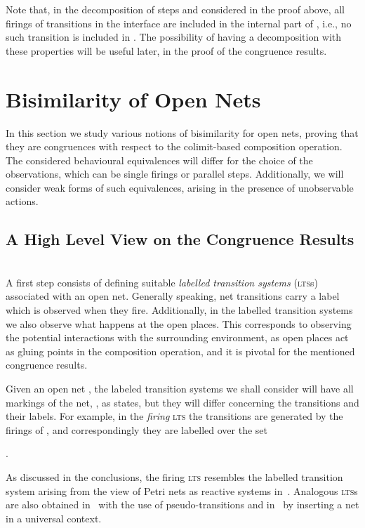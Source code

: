 \documentclass{LMCS}
\begin{document}
Note that, in the decomposition of steps  and  considered in
the proof above, all firings of transitions in the interface  are
included in the internal part of , i.e., no such transition is
included in .  The possibility of having a decomposition with
these properties will be useful later, in the proof of the congruence
results.


\section{Bisimilarity of Open Nets}
\label{se:bisim}

In this section we study various notions of bisimilarity for open
nets, proving that they are congruences with respect to the
colimit-based composition operation. The considered behavioural
equivalences will differ for the choice of the observations, which can
be single firings or parallel steps. Additionally, we will consider
weak forms of such equivalences, arising in the presence of
unobservable actions.


\subsection{A High Level View on the Congruence Results}
\ \\

\noindent
A first step consists of defining suitable \emph{labelled transition
  systems} (\textsc{lts}s) associated with an open net.  Generally
speaking, net transitions carry a label which is observed when they
fire. Additionally, in the labelled transition systems we
also observe what happens at the open places. This corresponds to
observing the potential interactions with the surrounding environment,
as open places act as gluing points in the composition operation, and
it is pivotal for the mentioned congruence results.

Given an open net , the labeled transition systems we
shall consider will have all markings of the net, , as
states, but they will differ concerning the transitions and their
labels. For example, in the \emph{firing} \textsc{lts} the transitions
are generated by the firings of , and correspondingly they are
labelled over the set
\begin{center}
  .
\end{center}
As discussed in the conclusions, the firing \textsc{lts} resembles the
labelled transition system arising from the view of Petri nets as
reactive systems in~\cite{Mil:BRS,SS:CPN}.
Analogous \textsc{lts}s are also obtained in~\cite{v:modular-petri}
with the use of pseudo-transitions and in~\cite{NPS:CBCP} by
inserting a net in a universal context.
\end{document}
